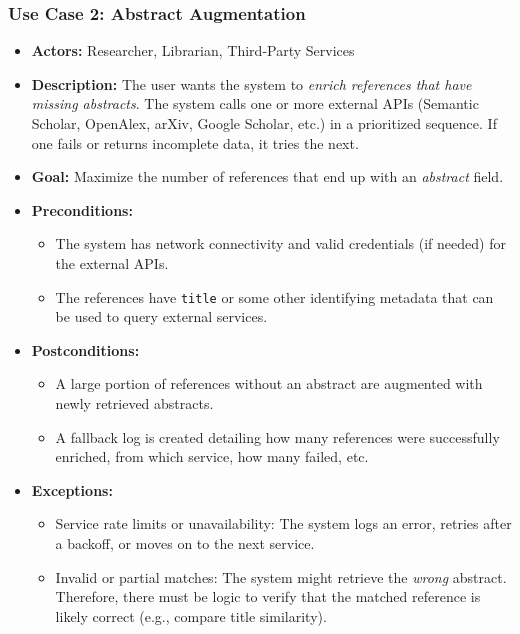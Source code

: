 \documentclass[12pt]{article}
\begin{document}
\subsubsection{Use Case 2: Abstract Augmentation}
\begin{itemize}
  \item \textbf{Actors:} Researcher, Librarian, Third-Party Services
  \item \textbf{Description:} The user wants the system to \emph{enrich references that have missing abstracts}. The system calls one or more external APIs (Semantic Scholar, OpenAlex, arXiv, Google Scholar, etc.) in a prioritized sequence. If one fails or returns incomplete data, it tries the next. 
  \item \textbf{Goal:} Maximize the number of references that end up with an \emph{abstract} field.
  \item \textbf{Preconditions:} 
    \begin{itemize}
      \item The system has network connectivity and valid credentials (if needed) for the external APIs.
      \item The references have \texttt{title} or some other identifying metadata that can be used to query external services.
    \end{itemize}
  \item \textbf{Postconditions:}
    \begin{itemize}
      \item A large portion of references without an abstract are augmented with newly retrieved abstracts.
      \item A fallback log is created detailing how many references were successfully enriched, from which service, how many failed, etc.
    \end{itemize}
  \item \textbf{Exceptions:}
    \begin{itemize}
      \item Service rate limits or unavailability: The system logs an error, retries after a backoff, or moves on to the next service.
      \item Invalid or partial matches: The system might retrieve the \emph{wrong} abstract. Therefore, there must be logic to verify that the matched reference is likely correct (e.g., compare title similarity).
    \end{itemize}
\end{itemize}
\end{document}
